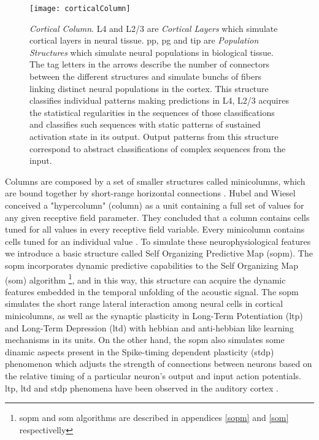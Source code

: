 \documentclass[11pt,a4paper]{article}
\begin{document}
\begin{figure}[h]
\centering
\texttt{[image: corticalColumn]}
\caption{\scriptsize{ \textit{Cortical Column}.
L4 and L2/3 are \textit{Cortical Layers} which simulate cortical layers in neural tissue.
\ac{pp}, \ac{pg} and \ac{tip} are \textit{Population Structures} which simulate neural populations
in biological tissue.
The tag letters in the arrows describe the number of connectors between the different structures
and simulate bunchs of fibers linking distinct neural populations in the cortex.
This structure classifies individual patterns making predictions in L4,
L2/3 acquires the statistical regularities
in the sequences of those classifications and
classifies such sequences with static patterns of sustained activation
state in its output.
Output patterns from this structure correspond
to abstract classifications of complex sequences from
the input.}}
\label{fig:cc}
\end{figure}

Columns are composed by a set of smaller structures called
minicolumns, which are bound together by short-range
horizontal connections \cite{mountcastle97}.
Hubel and Wiesel \cite{hubel74} conceived a "hypercolumn" (column) as a unit
containing a full set of values for any given receptive field parameter.
They concluded that a column contains cells tuned for all values in every
receptive field variable.
Every minicolumn contains cells tuned for an individual value \cite{horton05}.
To simulate these neurophysiological features we introduce a basic structure
called Self Organizing Predictive Map (\ac{sopm}).
The \ac{sopm} incorporates dynamic predictive capabilities
to the Self Organizing Map (\ac{som}) algorithm \cite{kohonen82, kohonen89}
\footnote{\ac{sopm} and \ac{som} algorithms are described in appendices \ref{sopm} and \ref{som} respectivelly},
and in this way, this structure can acquire the dynamic features embedded in the temporal unfolding of the acoustic signal.
The \ac{sopm} simulates the short range lateral interaction among neural cells in cortical minicolumns, 
as well as the synaptic plasticity in Long-Term Potentiation (\ac{ltp}) and Long-Term Depression (\ac{ltd})
with hebbian and anti-hebbian like learning mechanisms in its units.
On the other hand, the \ac{sopm} also simulates some dinamic aspects present in the
Spike-timing dependent plasticity (\ac{stdp}) phenomenon which adjusts the strength
of connections between neurons based on the relative timing of a particular neuron's output and input action potentials.
\ac{ltp}, \ac{ltd} and \ac{stdp} phenomena have been observed in the auditory cortex \cite{trussell12, feldman09}.\\
\end{document}
